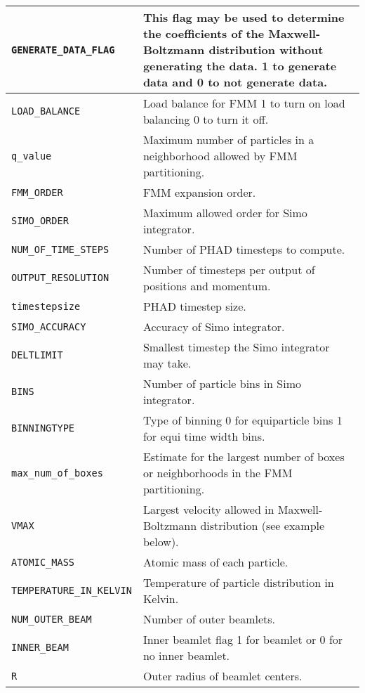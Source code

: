 \documentclass[12pt]{article}
\begin{document}
\begin{table}
\begin{tabular}{|l|p{4.25in}|}
\hline
\texttt{GENERATE{\_}DATA{\_}FLAG} & This flag may be used to determine the coefficients of the Maxwell-Boltzmann distribution without generating the data.  1 to generate data and 0 to not generate data.\\
\hline
\texttt{LOAD{\_}BALANCE} & Load balance for FMM 1 to turn on load balancing 0 to turn it off.\\
\hline
\texttt{q{\_}value} & Maximum number of particles in a neighborhood allowed by FMM partitioning.\\
\hline
\texttt{FMM{\_}ORDER} & FMM expansion order.\\
\hline
\texttt{SIMO{\_}ORDER} & Maximum allowed order for Simo integrator. \\
\hline
\texttt{NUM{\_}OF{\_}TIME{\_}STEPS} & Number of PHAD timesteps to compute. \\
\hline
\texttt{OUTPUT{\_}RESOLUTION} & Number of timesteps per output of positions and momentum.\\
\hline
\texttt{timestepsize} & PHAD timestep size.\\
\hline
\texttt{SIMO{\_}ACCURACY} & Accuracy of Simo integrator.\\
\hline
\texttt{DELTLIMIT} & Smallest timestep the Simo integrator may take.\\
\hline
\texttt{BINS} & Number of particle bins in Simo integrator.\\
\hline
\texttt{BINNINGTYPE} & Type of binning 0 for equiparticle bins 1 for equi time width bins.\\
\hline
\texttt{max{\_}num{\_}of{\_}boxes} & Estimate for the largest number of boxes or neighborhoods in the FMM partitioning.\\
\hline
\texttt{VMAX} & Largest velocity allowed in Maxwell-Boltzmann distribution (see example below).\\
\hline
\texttt{ATOMIC{\_}MASS} & Atomic mass of each particle.\\
\hline
\texttt{TEMPERATURE{\_}IN{\_}KELVIN} & Temperature of particle distribution in Kelvin.\\
\hline
\texttt{NUM{\_}OUTER{\_}BEAM} & Number of outer beamlets.\\
\hline
\texttt{INNER{\_}BEAM} & Inner beamlet flag 1 for beamlet or 0 for no inner beamlet.  \\
\hline
\texttt{R} & Outer radius of beamlet centers.\\

\end{tabular}
\end{table}
\end{document}
